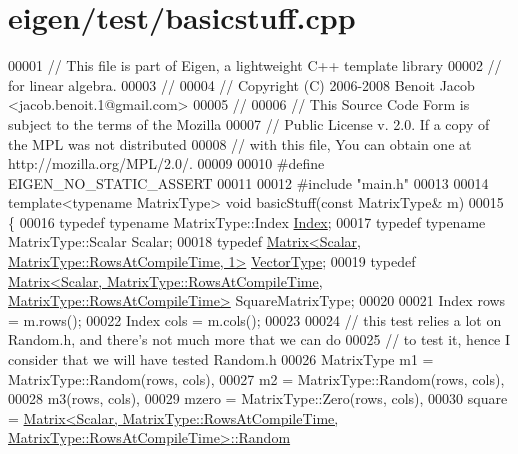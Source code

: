 \hypertarget{eigen_2test_2basicstuff_8cpp_source}{}\section{eigen/test/basicstuff.cpp}
\label{eigen_2test_2basicstuff_8cpp_source}

\begin{DoxyCode}
00001 \textcolor{comment}{// This file is part of Eigen, a lightweight C++ template library}
00002 \textcolor{comment}{// for linear algebra.}
00003 \textcolor{comment}{//}
00004 \textcolor{comment}{// Copyright (C) 2006-2008 Benoit Jacob <jacob.benoit.1@gmail.com>}
00005 \textcolor{comment}{//}
00006 \textcolor{comment}{// This Source Code Form is subject to the terms of the Mozilla}
00007 \textcolor{comment}{// Public License v. 2.0. If a copy of the MPL was not distributed}
00008 \textcolor{comment}{// with this file, You can obtain one at http://mozilla.org/MPL/2.0/.}
00009 
00010 \textcolor{preprocessor}{#define EIGEN\_NO\_STATIC\_ASSERT}
00011 
00012 \textcolor{preprocessor}{#include "main.h"}
00013 
00014 \textcolor{keyword}{template}<\textcolor{keyword}{typename} MatrixType> \textcolor{keywordtype}{void} basicStuff(\textcolor{keyword}{const} MatrixType& m)
00015 \{
00016   \textcolor{keyword}{typedef} \textcolor{keyword}{typename} MatrixType::Index \hyperlink{namespace_eigen_a62e77e0933482dafde8fe197d9a2cfde}{Index};
00017   \textcolor{keyword}{typedef} \textcolor{keyword}{typename} MatrixType::Scalar Scalar;
00018   \textcolor{keyword}{typedef} \hyperlink{group___core___module_class_eigen_1_1_matrix}{Matrix<Scalar, MatrixType::RowsAtCompileTime, 1>} 
      \hyperlink{struct_vector_type}{VectorType};
00019   \textcolor{keyword}{typedef} 
      \hyperlink{group___core___module_class_eigen_1_1_matrix}{Matrix<Scalar, MatrixType::RowsAtCompileTime, MatrixType::RowsAtCompileTime>}
       SquareMatrixType;
00020 
00021   Index rows = m.rows();
00022   Index cols = m.cols();
00023 
00024   \textcolor{comment}{// this test relies a lot on Random.h, and there's not much more that we can do}
00025   \textcolor{comment}{// to test it, hence I consider that we will have tested Random.h}
00026   MatrixType m1 = MatrixType::Random(rows, cols),
00027              m2 = MatrixType::Random(rows, cols),
00028              m3(rows, cols),
00029              mzero = MatrixType::Zero(rows, cols),
00030              square = 
      \hyperlink{group___core___module_class_eigen_1_1_matrix}{Matrix<Scalar, MatrixType::RowsAtCompileTime, MatrixType::RowsAtCompileTime>::Random}

\end{DoxyCode}
